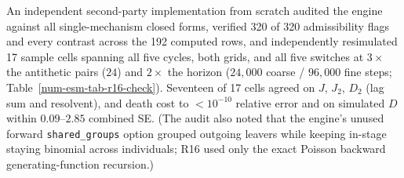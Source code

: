 An independent second-party implementation from scratch audited the engine against all single-mechanism closed forms, verified 320 of 320 admissibility flags and every contrast across the 192 computed rows, and independently resimulated 17 sample cells spanning all five cycles, both grids, and all five switches at $3\times$ the antithetic pairs ($24$) and $2\times$ the horizon ($24{,}000$ coarse / $96{,}000$ fine steps; Table~\ref{num-esm-tab-r16-check}). Seventeen of 17 cells agreed on $J$, $J_2$, $D_2$ (lag sum and resolvent), and death cost to $< 10^{-10}$ relative error and on simulated $D$ within $0.09$--$2.85$ combined SE. (The audit also noted that the engine's unused forward \texttt{shared\_groups} option grouped outgoing leavers while keeping in-stage staying binomial across individuals; R16 used only the exact Poisson backward generating-function recursion.)


